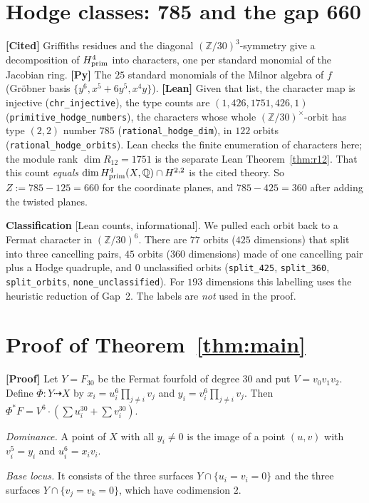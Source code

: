 \documentclass[11pt]{amsart}
\theoremstyle{remark}\newtheorem{remark}[theorem]{Remark}
\newcommand{\Q}{\mathbb{Q}}\newcommand{\PP}{\mathbb{P}}
\begin{document}
\section{Hodge classes: 785 and the gap 660}
\textbf{[Cited]} Griffiths residues and the diagonal $(\mathbb Z/30)^3$-symmetry give a
decomposition of $H^4_{\rm prim}$ into characters, one per standard monomial of the Jacobian ring.
\textbf{[Py]} The $25$ standard monomials of the Milnor algebra of $f$ (Gr\"obner basis
$\{y^6,x^5+6y^5,x^4y\}$). \textbf{[Lean]} Given that list, the character map is injective
(\texttt{chr\_injective}), the type counts are $(1,426,1751,426,1)$
(\texttt{primitive\_hodge\_numbers}), the characters whose whole $(\mathbb Z/30)^\times$-orbit has
type $(2,2)$ number $785$ (\texttt{rational\_hodge\_dim}), in $122$ orbits
(\texttt{rational\_hodge\_orbits}). Lean checks the finite enumeration of
characters here; the module rank $\dim R_{12}=1751$ is the separate Lean
Theorem~\ref{thm:r12}. That this count \emph{equals} $\dim H^4_{\rm prim}(X,\Q)\cap H^{2,2}$
is the cited theory. So $Z:=785-125=660$ for the
coordinate planes, and $785-425=360$ after adding the twisted planes.

\textbf{Classification} [Lean counts, informational]. We pulled each orbit back to a Fermat character in
$(\mathbb Z/30)^6$. There are $77$ orbits ($425$ dimensions) that split into three cancelling
pairs, $45$ orbits ($360$ dimensions) made of one cancelling pair plus a Hodge quadruple, and
$0$ unclassified orbits (\texttt{split\_425}, \texttt{split\_360}, \texttt{split\_orbits},
\texttt{none\_unclassified}). For $193$ dimensions this labelling uses the heuristic reduction of
Gap~2. The labels are \emph{not} used in the proof.

\section{Proof of Theorem~\ref{thm:main}}\label{sec:descent}
\textbf{[Proof]} Let $Y=F_{30}$ be the Fermat fourfold of degree $30$ and put $V=v_0v_1v_2$.
Define $\Phi:Y\dashrightarrow X$ by $x_i=u_i^6\prod_{j\ne i}v_j$ and $y_i=v_i^6\prod_{j\ne i}v_j$.
Then $\Phi^*F=V^6\cdot(\sum u_i^{30}+\sum v_i^{30})$.

\emph{Dominance.} A point of $X$ with all $y_i\neq0$ is the image of a point $(u,v)$ with
$v_i^5=y_i$ and $u_i^6=x_iv_i$.

\emph{Base locus.} It consists of the three surfaces $Y\cap\{u_i=v_i=0\}$ and the three surfaces
$Y\cap\{v_j=v_k=0\}$, which have codimension $2$.
\end{document}
